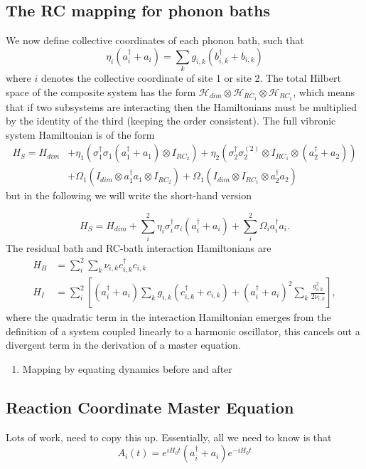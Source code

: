 \documentclass[]{article}
\begin{document}
\subsection{The RC mapping for phonon baths}
We now define collective coordinates of each phonon bath, such that 
\begin{equation}
\eta_i (a_i^{\dagger} + a_i) = \sum_k g_{i,k}(b^{\dagger}_{i,k} + b_{i,k})
\end{equation}
where $i$ denotes the collective coordinate of site 1 or site 2.
The total Hilbert space of the composite system has the form $\mathcal{H}_{dim} \otimes \mathcal{H}_{RC_1} \otimes \mathcal{H}_{RC_1}$, which means that if two subsystems are interacting then the Hamiltonians must be multiplied by the identity of the third (keeping the order consistent). The full vibronic system Hamiltonian is of the form
\begin{align}
	H_{S}= H_{dim} &+ \eta_1\left(\sigma_1^{\dagger}\sigma_1(a_1^{\dagger}+a_1)\otimes I_{RC_2}\right) + \eta_2\left(\sigma_2^{\dagger}\sigma_2^{(2)}\otimes I_{RC_1}\otimes(a_2^{\dagger}+a_2)\right) \\
	&+\Omega_1 \left( I_{dim}\otimes a_1^{\dagger}a_1 \otimes I_{RC_2}\right)+\Omega_1 \left( I_{dim}\otimes I_{RC_1}\otimes a_2^{\dagger}a_2 \right)
\end{align}
but in the following we will write the short-hand version

\begin{equation}
	H_{S}= H_{dim} + \sum_i^2 \eta_i \sigma_i^{\dagger}\sigma_i (a_i^{\dagger}+a_i) +\sum_i^2 \Omega_i a_i^{\dagger}a_i.
\end{equation}
The residual bath and RC-bath interaction Hamiltonians are
\begin{align}
	H_B &= \sum_{i}^2\sum_{k} \nu_{i,k}  c_{i,k}^{\dagger} c_{i,k} \\
	H_I &=  \sum_{i}^{2} \left[(a_i^{\dagger} + a_i) \sum_{k}g_{i,k} ( c_{i,k}^{\dagger} + c_{i,k}) + (a_i^{\dagger} + a_i)^2\sum_{k} \frac{g_{i,k}^2}{2\nu_{i,k}}\right],
\end{align}
where the quadratic term in the interaction Hamiltonian emerges from the definition of a system coupled linearly to a harmonic oscillator, this cancels out a divergent term in the derivation of a master equation.
\begin{enumerate}
	\item Mapping by equating dynamics before and after
\end{enumerate}
\subsection{Reaction Coordinate Master Equation}
Lots of work, need to copy this up.
Essentially, all we need to know is that 
\begin{equation}
A_i(t) =e^{i H_0 t}(a_i^{\dagger} + a_i)e^{-i H_0 t}
\end{equation}
\end{document}
